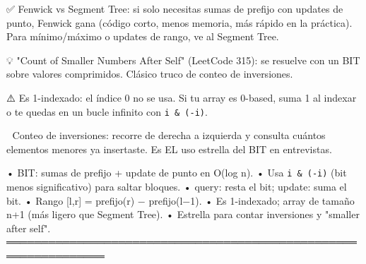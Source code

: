 \begin{dsaentrevistas}

✅ Fenwick vs Segment Tree: si solo necesitas sumas de prefijo con
   updates de punto, Fenwick gana (código corto, menos memoria, más
   rápido en la práctica). Para mínimo/máximo o updates de rango, ve al
   Segment Tree.

💡 "Count of Smaller Numbers After Self" (LeetCode 315): se resuelve con
   un BIT sobre valores comprimidos. Clásico truco de conteo de
   inversiones.

⚠️ Es 1-indexado: el índice 0 no se usa. Si tu array es 0-based, suma 1
   al indexar o te quedas en un bucle infinito con \verb|i & (-i)|.

🔑 Conteo de inversiones: recorre de derecha a izquierda y consulta
   cuántos elementos menores ya insertaste. Es EL uso estrella del BIT en
   entrevistas.

\end{dsaentrevistas}

\begin{dsaresumen}

• BIT: sumas de prefijo + update de punto en O(log n).
• Usa \verb|i & (-i)| (bit menos significativo) para saltar bloques.
• query: resta el bit; update: suma el bit.
• Rango [l,r] = prefijo(r) − prefijo(l−1).
• Es 1-indexado; array de tamaño n+1 (más ligero que Segment Tree).
• Estrella para contar inversiones y "smaller after self".
════════════════════════════════════════════════════════════════

\end{dsaresumen}

